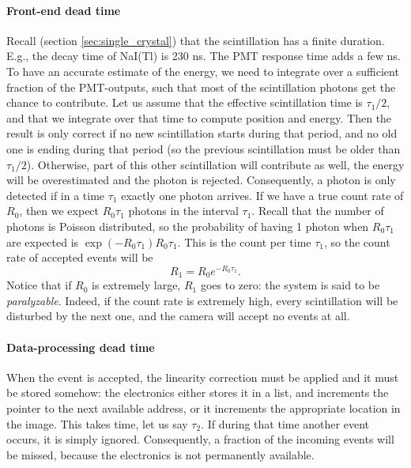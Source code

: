 \documentclass[11pt,oneside]{article}
\begin{document}
\paragraph{Front-end dead time}
Recall (section \ref{sec:single_crystal}) that the scintillation has
a finite duration. E.g., the decay time of NaI(Tl) is 230 ns. The PMT
response time adds a few ns. To have an accurate estimate of the
energy, we need to integrate over a sufficient fraction of the
PMT-outputs, such that most of the scintillation photons get the
chance to contribute. Let us assume that the effective scintillation
time is $\tau_1 / 2$, and that we integrate over that time to compute
position and energy. Then the result is only correct if no new
scintillation starts during that period, and no old one is ending
during that period (so the previous scintillation must be older than
$\tau_1/2$).  Otherwise, part of this other scintillation will
contribute as well, the energy will be overestimated and the photon is
rejected. Consequently, a photon is only detected if in a time
$\tau_1$ exactly one photon arrives.  If we have a true count rate of
$R_0$, then we expect $R_0 \tau_1$ photons in the interval
$\tau_1$. Recall that the number of photons is Poisson distributed, so
the probability of having 1 photon when $R_0 \tau_1$ are expected is
$\exp(- R_0 \tau_1) R_0 \tau_1$. This is the count per time $\tau_1$,
so the count rate of accepted events will be
\begin{equation}
  R_1 = R_0 e^{-R_0 \tau_1}. \label{eq:deadtime_front}
\end{equation}
Notice that if $R_0$ is extremely large, $R_1$ goes to zero: the system is
said to be {\em paralyzable}. Indeed, if the count rate is extremely high,
every scintillation will be disturbed by the next one, and the camera will
accept no events at all.

\paragraph{Data-processing dead time}
When the event is accepted, the linearity correction must be applied and it
must be stored somehow: the electronics either stores it in a list, and
increments the pointer to the next available address, or it increments the
appropriate location in the image. This takes time, let us say $\tau_2$. If
during that time another event occurs, it is simply ignored. Consequently, a
fraction of the incoming events will be missed, because the electronics is not
permanently available.
\end{document}
